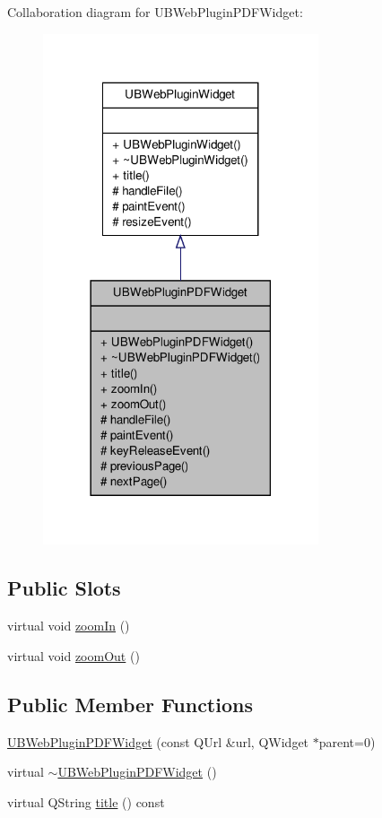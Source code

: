 Collaboration diagram for U\-B\-Web\-Plugin\-P\-D\-F\-Widget\-:
\nopagebreak
\begin{figure}[H]
\begin{center}
\leavevmode
\includegraphics[width=230pt]{d3/d64/class_u_b_web_plugin_p_d_f_widget__coll__graph}
\end{center}
\end{figure}
\subsection*{Public Slots}
\begin{DoxyCompactItemize}
\item 
virtual void \hyperlink{class_u_b_web_plugin_p_d_f_widget_a0c77fa1b5d0accd81d80ef4d2445ee53}{zoom\-In} ()
\item 
virtual void \hyperlink{class_u_b_web_plugin_p_d_f_widget_a9281d1b6956192327c08bd69ccb93c55}{zoom\-Out} ()
\end{DoxyCompactItemize}
\subsection*{Public Member Functions}
\begin{DoxyCompactItemize}
\item 
\hyperlink{class_u_b_web_plugin_p_d_f_widget_af6bb30766564897a4bd35bca953379f8}{U\-B\-Web\-Plugin\-P\-D\-F\-Widget} (const Q\-Url \&url, Q\-Widget $\ast$parent=0)
\item 
virtual \hyperlink{class_u_b_web_plugin_p_d_f_widget_a254f94fca302f688ccb288e14d55cf6c}{$\sim$\-U\-B\-Web\-Plugin\-P\-D\-F\-Widget} ()
\item 
virtual Q\-String \hyperlink{class_u_b_web_plugin_p_d_f_widget_a650cacdfc6f5cf51f8464ca7bfdfab9e}{title} () const 
\end{DoxyCompactItemize}
